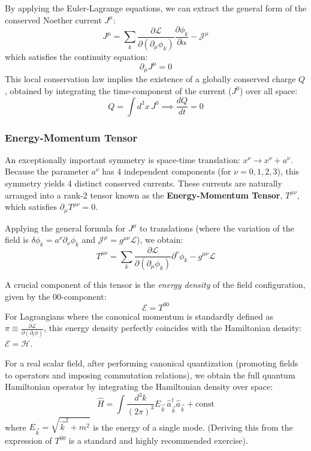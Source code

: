 By applying the Euler-Lagrange equations, we can extract the general form of the conserved Noether current $J^\mu$:
\[
    J^\mu = \sum_k \frac{\partial \mathcal{L}}{\partial(\partial_\mu \phi_k)} \frac{\partial \phi_k}{\partial \alpha} - \mathcal{J}^\mu
\]
which satisfies the continuity equation:
\[
    \partial_\mu J^\mu = 0
\]
This local conservation law implies the existence of a globally conserved charge $Q$, obtained by integrating the time-component of the current ($J^0$) over all space:
\[
    Q = \int d^3x \, J^0 \implies \frac{dQ}{dt} = 0
\]

\subsubsection{Energy-Momentum Tensor}

An exceptionally important symmetry is space-time translation: $x^\nu \to x^\nu + a^\nu$. Because the parameter $a^\nu$ has 4 independent components (for $\nu=0,1,2,3$), this symmetry yields 4 distinct conserved currents. These currents are naturally arranged into a rank-2 tensor known as the \textbf{Energy-Momentum Tensor}, $T^{\mu\nu}$, which satisfies $\partial_\mu T^{\mu\nu} = 0$.

Applying the general formula for $J^\mu$ to translations (where the variation of the field is $\delta \phi_k = a^\nu \partial_\nu \phi_k$ and $\mathcal{J}^\mu = g^{\mu\nu} \mathcal{L}$), we obtain:
\[
    T^{\mu\nu} = \sum_k \frac{\partial \mathcal{L}}{\partial(\partial_\mu \phi_k)} \partial^\nu \phi_k - g^{\mu\nu} \mathcal{L}
\]

A crucial component of this tensor is the \textit{energy density} of the field configuration, given by the $00$-component:
\[
    \mathcal{E} = T^{00}
\]
For Lagrangians where the canonical momentum is standardly defined as $\pi \equiv \frac{\partial \mathcal{L}}{\partial(\partial_t \phi)}$, this energy density perfectly coincides with the Hamiltonian density: $\mathcal{E} = \mathcal{H}$.

For a real scalar field, after performing canonical quantization (promoting fields to operators and imposing commutation relations), we obtain the full quantum Hamiltonian operator by integrating the Hamiltonian density over space:
\[
    \hat{H} = \int \frac{d^3k}{(2\pi)^3} E_{\vec{k}} \, \hat{a}_{\vec{k}}^\dagger \hat{a}_{\vec{k}} + \text{const}
\]
where $E_{\vec{k}} = \sqrt{\vec{k}^2 + m^2}$ is the energy of a single mode. (Deriving this from the expression of $T^{00}$ is a standard and highly recommended exercise).

